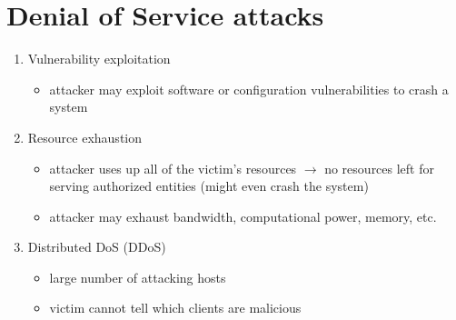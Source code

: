 \documentclass[final]{article}
\begin{document}
\section{Denial of Service attacks}
\begin{enumerate}[nosep]
    \item Vulnerability exploitation
          \begin{itemize}[nosep]
              \item attacker may exploit software or configuration vulnerabilities to crash a system
          \end{itemize}
    \item Resource exhaustion
          \begin{itemize}[nosep]
              \item attacker uses up all of the victim’s resources $\rightarrow$ no resources left for serving authorized entities (might even crash the system)
              \item attacker may exhaust bandwidth, computational power, memory, etc.
          \end{itemize}
    \item Distributed DoS (DDoS)
          \begin{itemize}[nosep]
              \item large number of attacking hosts
              \item victim cannot tell which clients are malicious
          \end{itemize}
\end{enumerate}
\end{document}
